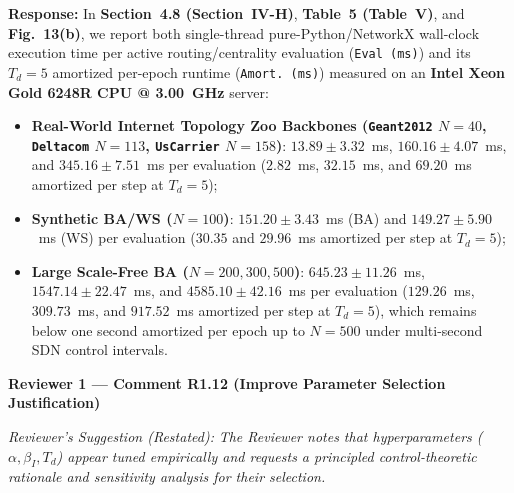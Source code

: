 \documentclass[11pt,a4paper]{article}
\newcommand{\cbox}[2]{%
  \vspace{0.6em}\noindent\textbf{#1}\par\smallskip
  \noindent\textit{Reviewer's Suggestion (Restated):} \textit{#2}\par\smallskip
}
\begin{document}
\noindent\textbf{Response:} In \textbf{Section~4.8 (Section~IV-H)}, \textbf{Table~5 (Table~V)}, and \textbf{Fig.~13(b)}, we report both single-thread pure-Python/NetworkX wall-clock execution time per active routing/centrality evaluation (\texttt{Eval (ms)}) and its $T_d=5$ amortized per-epoch runtime (\texttt{Amort.\ (ms)}) measured on an \textbf{Intel Xeon Gold 6248R CPU @ 3.00~GHz} server:
\begin{itemize}[leftmargin=1.8em]
    \item \textbf{Real-World Internet Topology Zoo Backbones (\texttt{Geant2012} $N=40$, \texttt{Deltacom} $N=113$, \texttt{UsCarrier} $N=158$)}: $13.89 \pm 3.32$~ms, $160.16 \pm 4.07$~ms, and $345.16 \pm 7.51$~ms per evaluation ($2.82$~ms, $32.15$~ms, and $69.20$~ms amortized per step at $T_d=5$);
    \item \textbf{Synthetic BA/WS ($N=100$)}: $151.20 \pm 3.43$~ms (BA) and $149.27 \pm 5.90$~ms (WS) per evaluation ($30.35$ and $29.96$~ms amortized per step at $T_d=5$);
    \item \textbf{Large Scale-Free BA ($N=200, 300, 500$)}: $645.23 \pm 11.26$~ms, $1547.14 \pm 22.47$~ms, and $4585.10 \pm 42.16$~ms per evaluation ($129.26$~ms, $309.73$~ms, and $917.52$~ms amortized per step at $T_d=5$), which remains below one second amortized per epoch up to $N=500$ under multi-second SDN control intervals.
\end{itemize}

\hrulefill

\cbox{Reviewer 1 --- Comment R1.12 (Improve Parameter Selection Justification)}{The Reviewer notes that hyperparameters ($\alpha, \beta_I, T_d$) appear tuned empirically and requests a principled control-theoretic rationale and sensitivity analysis for their selection.}
\end{document}
